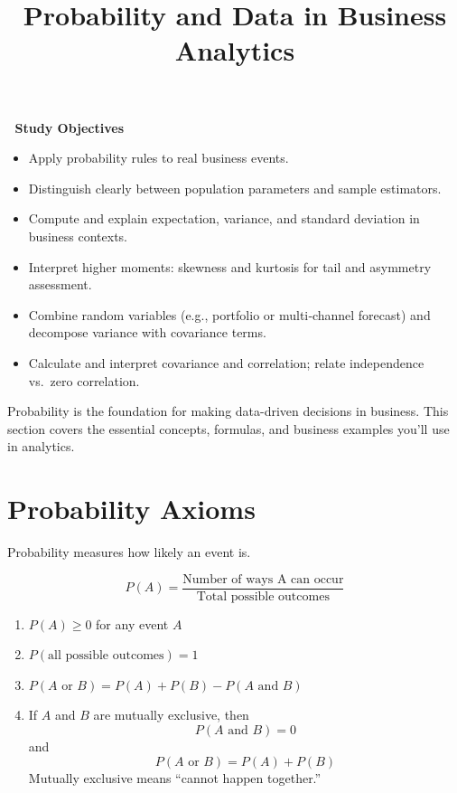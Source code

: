 \documentclass[
  12pt,
]{scrbook}
\title{Probability and Data in Business Analytics}
\author{}
\date{}
\providecommand{\tightlist}{%
  \setlength{\itemsep}{0pt}\setlength{\parskip}{0pt}}
\renewcommand{\tightlist}{\setlength{\itemsep}{0.5\baselineskip}\setlength{\parskip}{0.2\baselineskip}}
\theoremstyle{definition}
\theoremstyle{remark}
\begin{document}
\frontmatter
\maketitle


\mainmatter
\begin{tcolorbox}[enhanced jigsaw, left=2mm, rightrule=.15mm, opacityback=0, arc=.35mm, leftrule=.75mm, colframe=quarto-callout-note-color-frame, bottomrule=.15mm, colback=white, breakable, toprule=.15mm]

🎯 \textbf{Study Objectives}

\begin{itemize}
\tightlist
\item
  Apply probability rules to real business events.
\item
  Distinguish clearly between population parameters and sample
  estimators.
\item
  Compute and explain expectation, variance, and standard deviation in
  business contexts.
\item
  Interpret higher moments: skewness and kurtosis for tail and asymmetry
  assessment.
\item
  Combine random variables (e.g., portfolio or multi‑channel forecast)
  and decompose variance with covariance terms.
\item
  Calculate and interpret covariance and correlation; relate
  independence vs.~zero correlation.
\end{itemize}

\end{tcolorbox}

Probability is the foundation for making data-driven decisions in
business. This section covers the essential concepts, formulas, and
business examples you'll use in analytics.

\section{Probability Axioms}\label{probability-axioms}

Probability measures how likely an event is.

\[P(A) = \frac{\text{Number of ways A can occur}}{\text{Total possible outcomes}}\]

\begin{enumerate}
\def\labelenumi{\arabic{enumi}.}
\tightlist
\item
  \(P(A) \geq 0\) for any event \(A\)
\item
  \(P(\text{all possible outcomes}) = 1\)
\item
  \(P(A \text{ or } B) = P(A) + P(B) - P(A\text{ and }B)\)
\item
  If \(A\) and \(B\) are mutually exclusive, then \[
  P(A \text{ and } B) = 0
  \] and \[
  P(A \text{ or } B) = P(A) + P(B)
  \] Mutually exclusive means ``cannot happen together.''
\end{enumerate}
\end{document}
